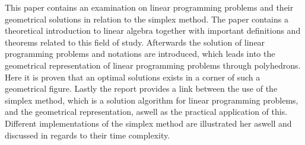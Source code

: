 This paper contains an examination on linear programming problems and their geometrical solutions in relation to the simplex method. 
The paper contains a theoretical introduction to linear algebra together with important definitions and theorems related to this field of study. 
Afterwards the solution of linear programming problems and notations are introduced, which leads into the geometrical representation of  linear programming problems through polyhedrons. Here it is proven that an optimal solutions exists in a corner of such a geometrical figure.
Lastly the report provides a link between the use of the simplex method, which is a solution algorithm for linear programming problems, and the geometrical representation, aswell as the practical application of this.
Different implementations of the simplex method are illustrated her aswell and discussed in regards to their time complexity. 